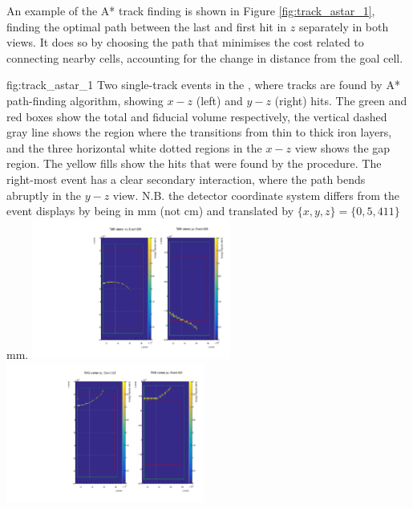 An example of the A* track finding is shown in Figure \ref{fig:track_astar_1}, finding the optimal path between the last and first hit in $z$ separately in both views. It does so by choosing the path that minimises the cost related to connecting nearby cells, accounting for the change in distance from the goal cell. 
\begin{dunefigure}{fig:track_astar_1}
{Two single-track events in the , where tracks are found by A* path-finding algorithm, showing $x-z$ (left) and $y-z$ (right) hits. The green and red boxes show the total and fiducial volume respectively, the vertical dashed gray line shows the region where the  transitions from thin to thick iron layers, and the three horizontal white dotted regions in the $x-z$ view shows the gap region. The yellow fills show the hits that were found by the procedure. The right-most event has a clear secondary interaction, where the path bends abruptly in the $y-z$ view. N.B. the detector coordinate system differs from the event displays by being in mm (not cm) and translated by $\{x,y,z\}=\{0, 5, 411\}$ mm. }
\includegraphics[width=0.49\textwidth]{graphics/tms/Simulation/Astar/track_example_astar2.pdf} \includegraphics[width=0.49\textwidth]{graphics/tms/Simulation/Astar/track_example_astar3.pdf}
\end{dunefigure}

